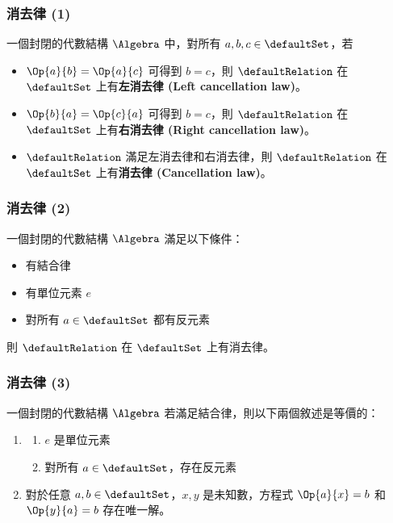 \documentclass[utf8]{beamer}
\begin{document}
\begin{CJK}{UTF8}{bkai}
\begin{frame}
  \frametitle{消去律 (1)}
  \begin{mydef}[消去律]
  \label{def:algebra:cancellation_law}
  一個封閉的代數結構 $\Algebra$ 中，對所有 $a,b,c\in{\defaultSet}$，若
  \begin{itemize}
  \item $\Op{a}{b}=\Op{a}{c}$ 可得到 $b=c$，則 $\defaultRelation$ 在 $\defaultSet$ 上有\textbf{左消去律 (Left cancellation law)}。
  \item $\Op{b}{a}=\Op{c}{a}$ 可得到 $b=c$，則 $\defaultRelation$ 在 $\defaultSet$ 上有\textbf{右消去律 (Right cancellation law)}。
  \item $\defaultRelation$ 滿足左消去律和右消去律，則 $\defaultRelation$ 在 $\defaultSet$ 上有\textbf{消去律 (Cancellation law)}。
  \end{itemize}
  \end{mydef}
\end{frame}

\begin{frame}
  \frametitle{消去律 (2)}
  \begin{mythm}[消去律性質]
  \label{thm:algebra:cancellation_law}
  一個封閉的代數結構 $\Algebra$ 滿足以下條件：
  \begin{itemize}
  \item 有結合律
  \item 有單位元素 $e$
  \item 對所有 $a\in{\defaultSet}$ 都有反元素
  \end{itemize}
  則 $\defaultRelation$ 在 $\defaultSet$ 上有消去律。
  \end{mythm}
\end{frame}

\begin{frame}
  \frametitle{消去律 (3)}
  \begin{mythm}
  \label{thm:algebra:identity_inverse_equilibrium}
  一個封閉的代數結構 $\Algebra$ 若滿足結合律，則以下兩個敘述是等價的：
  \begin{enumerate}
  \item<2-> \label{thm:algebra:id_inv_eq_first}
      \begin{enumerate}
      \item $e$ 是單位元素
      \item 對所有 $a\in{\defaultSet}$，存在反元素
      \end{enumerate}
  \item<3-> \label{thm:algebra:id_inv_eq_second} 對於任意 $a,b\in{\defaultSet}$，$x,y$ 是未知數，方程式 $\Op{a}{x}=b$ 和 $\Op{y}{a}=b$ 存在唯一解。
  \end{enumerate}
  \end{mythm}
\end{frame}


\end{CJK}
\end{document}
